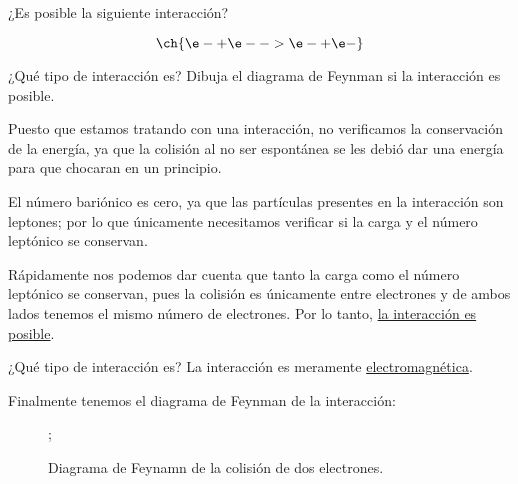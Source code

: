 \documentclass[./../main.tex]{subfiles}
\begin{document}
    \begin{exercise}
        ¿Es posible la siguiente interacción?

        \begin{equation*}
            \ch{\e- + \e- -> \e- + \e-}
        \end{equation*}

        ¿Qué tipo de interacción es? Dibuja el diagrama de Feynman si la interacción es posible.

        \begin{solution}
            Puesto que estamos tratando con una interacción, no verificamos la conservación de la energía, ya que la colisión al no ser espontánea se les debió dar una energía para que chocaran en un principio.

            El número bariónico es cero, ya que las partículas presentes en la interacción son leptones; por lo que únicamente necesitamos verificar si la carga y el número leptónico se conservan.

            Rápidamente nos podemos dar cuenta que tanto la carga como el número leptónico se conservan, pues la colisión es únicamente entre electrones y de ambos lados tenemos el mismo número de electrones. Por lo tanto, \ul{la interacción es posible}.

            ¿Qué tipo de interacción es? La interacción es meramente \ul{electromagnética}.

            Finalmente tenemos el diagrama de Feynman de la interacción:

            \begin{figure}[htb]
                \centering
                ;
                \caption{Diagrama de Feynamn de la colisión de dos electrones.}
                \label{fig:electrons-collision}
            \end{figure}
        \end{solution}
    \end{exercise}
\end{document}
